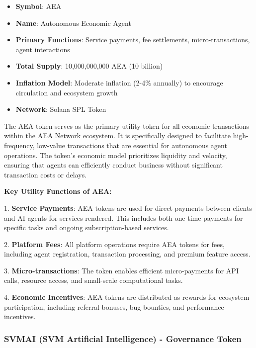 \documentclass[12pt,a4paper]{article}
\begin{document}
\begin{itemize}
\item \textbf{Symbol}: AEA
\item \textbf{Name}: Autonomous Economic Agent
\item \textbf{Primary Functions}: Service payments, fee settlements, micro-transactions, agent interactions
\item \textbf{Total Supply}: 10,000,000,000 AEA (10 billion)
\item \textbf{Inflation Model}: Moderate inflation (2-4\% annually) to encourage circulation and ecosystem growth
\item \textbf{Network}: Solana SPL Token
\end{itemize}

The AEA token serves as the primary utility token for all economic transactions within the AEA Network ecosystem. It is specifically designed to facilitate high-frequency, low-value transactions that are essential for autonomous agent operations. The token's economic model prioritizes liquidity and velocity, ensuring that agents can efficiently conduct business without significant transaction costs or delays.

\textbf{Key Utility Functions of AEA:}

1. \textbf{Service Payments}: AEA tokens are used for direct payments between clients and AI agents for services rendered. This includes both one-time payments for specific tasks and ongoing subscription-based services.

2. \textbf{Platform Fees}: All platform operations require AEA tokens for fees, including agent registration, transaction processing, and premium feature access.

3. \textbf{Micro-transactions}: The token enables efficient micro-payments for API calls, resource access, and small-scale computational tasks.

4. \textbf{Economic Incentives}: AEA tokens are distributed as rewards for ecosystem participation, including referral bonuses, bug bounties, and performance incentives.

\subsubsection{SVMAI (SVM Artificial Intelligence) - Governance Token}
\end{document}
